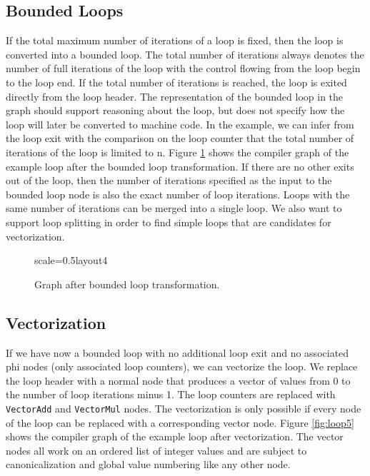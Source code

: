 \documentclass[twocolumn]{svjour3}
\begin{document}
\subsection{Bounded Loops}

If the total maximum number of iterations of a loop is fixed, then the loop is converted into a bounded loop.
The total number of iterations always denotes the number of full iterations of the loop with the control flowing from the loop begin to the loop end.
If the total number of iterations is reached, the loop is exited directly from the loop header.
The representation of the bounded loop in the graph should support reasoning about the loop, but does not specify how the loop will later be converted to machine code.
In the example, we can infer from the loop exit with the comparison on the loop counter that the total number of iterations of the loop is limited to n.
Figure \ref{fig:loop4} shows the compiler graph of the example loop after the bounded loop transformation.
If there are no other exits out of the loop, then the number of iterations specified as the input to the bounded loop node is also the exact number of loop iterations.
Loops with the same number of iterations can be merged into a single loop.
We also want to support loop splitting in order to find simple loops that are candidates for vectorization.

\begin{figure}[ht]
  \centering
\begin{digraphenv}{scale=0.5}{layout4}
\end{digraphenv}
  \caption{Graph after bounded loop transformation.}
  \label{fig:loop4}
\end{figure}

\subsection{Vectorization}

If we have now a bounded loop with no additional loop exit and no associated phi nodes (only associated loop counters), we can vectorize the loop.
We replace the loop header with a normal node that produces a vector of values from 0 to the number of loop iterations minus 1.
The loop counters are replaced with \texttt{VectorAdd} and \texttt{VectorMul} nodes.
The vectorization is only possible if every node of the loop can be replaced with a corresponding vector node.
Figure \ref{fig:loop5} shows the compiler graph of the example loop after vectorization.
The vector nodes all work on an ordered list of integer values and are subject to canonicalization and global value numbering like any other node.
\end{document}

